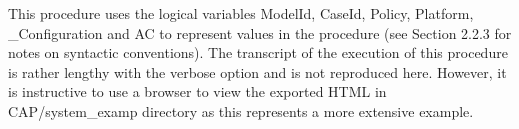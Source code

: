 \documentclass[12pt,twoside,a4paper]{article}
\begin{document}
This procedure uses the logical variables ModelId, CaseId, Policy, Platform, \_Configuration and AC to represent values in the procedure (see Section 2.2.3 for notes on syntactic conventions). The transcript of the execution of this procedure is rather lengthy with the verbose option and is not reproduced here. However, it is instructive to use a browser to view the exported HTML in CAP/system\_examp directory as this represents a more extensive example.






\end{document}
